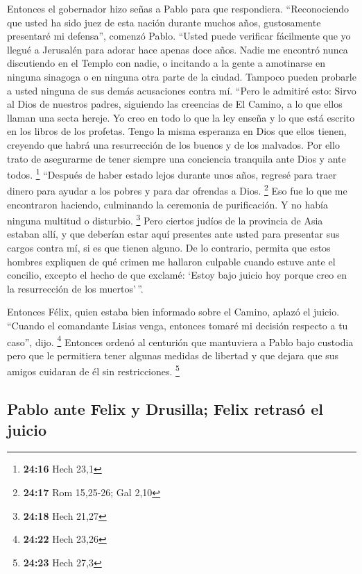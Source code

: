  Entonces el gobernador hizo señas a Pablo para que
respondiera. ``Reconociendo que usted ha sido juez de esta nación
durante muchos años, gustosamente presentaré mi defensa'', comenzó
Pablo.  ``Usted puede verificar fácilmente que yo llegué
a Jerusalén para adorar hace apenas doce años.  Nadie me
encontró nunca discutiendo en el Templo con nadie, o incitando a la
gente a amotinarse en ninguna sinagoga o en ninguna otra parte de la
ciudad.  Tampoco pueden probarle a usted ninguna de sus
demás acusaciones contra mí.  ``Pero le admitiré esto:
Sirvo al Dios de nuestros padres, siguiendo las creencias de El Camino,
a lo que ellos llaman una secta hereje. Yo creo en todo lo que la ley
enseña y lo que está escrito en los libros de los profetas.
 Tengo la misma esperanza en Dios que ellos tienen,
creyendo que habrá una resurrección de los buenos y de los malvados.
 Por ello trato de asegurarme de tener siempre una
conciencia tranquila ante Dios y ante todos. \footnote{\textbf{24:16}
  Hech 23,1}  ``Después de haber estado lejos durante
unos años, regresé para traer dinero para ayudar a los pobres y para dar
ofrendas a Dios. \footnote{\textbf{24:17} Rom 15,25-26; Gal 2,10}
 Eso fue lo que me encontraron haciendo, culminando la
ceremonia de purificación. Y no había ninguna multitud o disturbio.
\footnote{\textbf{24:18} Hech 21,27}  Pero ciertos judíos
de la provincia de Asia estaban allí, y que deberían estar aquí
presentes ante usted para presentar sus cargos contra mí, si es que
tienen alguno.  De lo contrario, permita que estos
hombres expliquen de qué crimen me hallaron culpable cuando estuve ante
el concilio,  excepto el hecho de que exclamé: `Estoy
bajo juicio hoy porque creo en la resurrección de los muertos'\,''.

 Entonces Félix, quien estaba bien informado sobre el
Camino, aplazó el juicio. ``Cuando el comandante Lisias venga, entonces
tomaré mi decisión respecto a tu caso'', dijo. \footnote{\textbf{24:22}
  Hech 23,26}  Entonces ordenó al centurión que
mantuviera a Pablo bajo custodia pero que le permitiera tener algunas
medidas de libertad y que dejara que sus amigos cuidaran de él sin
restricciones. \footnote{\textbf{24:23} Hech 27,3}

\hypertarget{pablo-ante-felix-y-drusilla-felix-retrasuxf3-el-juicio}{%
\subsection{Pablo ante Felix y Drusilla; Felix retrasó el
juicio}\label{pablo-ante-felix-y-drusilla-felix-retrasuxf3-el-juicio}}

